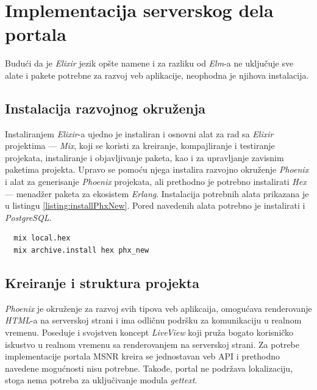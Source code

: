 \documentclass[12pt,oneside]{memoir}
\begin{document}
\chapter{Implementacija serverskog dela portala}

Budući da je \emph{Elixir} jezik opšte namene i za razliku od \emph{Elm}-a ne uključuje sve alate i pakete
potrebne za razvoj veb aplikacije, neophodna je njihova instalacija.

\section{Instalacija razvojnog okruženja}
Instaliranjem \emph{Elixir}-a ujedno je instaliran i osnovni alat za rad sa \emph{Elixir} projektima --- \emph{Mix}, koji se koristi za
kreiranje, kompajliranje i testiranje projekata, instaliranje i objavljivanje paketa, kao i za upravljanje zavisnim paketima projekta.
Upravo se pomoću njega instalira razvojno okruženje \emph{Phoenix} i alat za generisanje \emph{Phoenix} projekata, ali prethodno je potrebno instalirati
\emph{Hex} \cite{hex} --- menadžer paketa za ekosistem \emph{Erlang}. Instalacija potrebnih alata prikazana je u listingu \ref{listing:installPhxNew}.
Pored navedenih alata potrebno je instalirati i \emph{PostgreSQL}.

\begin{listing}[h]
\begin{verbatim}
  mix local.hex
  mix archive.install hex phx_new
\end{verbatim}
\caption{Instalacija alata \emph{hex} i \emph{phx{\textunderscore}new}}
\label{listing:installPhxNew}
\end{listing}

\section{Kreiranje i struktura projekta}
\emph{Phoenix} je okruženje za razvoj svih tipova veb aplikcaija, omogućava renderovanje \emph{HTML}-a na serverskoj strani i ima odličnu podršku
za komunikaciju u realnom vremenu. Poseduje i svojstven koncept \emph{LiveView} koji pruža bogato korisničko iskustvo u realnom vremenu sa
renderovanjem na serverskoj strani. Za potrebe implementacije portala MSNR kreira se jednostavan veb API i prethodno navedene mogućnosti nisu potrebne.
Takođe, portal ne podržava lokalizaciju, stoga nema potreba za uključivanje modula \emph{gettext}.
\end{document}
